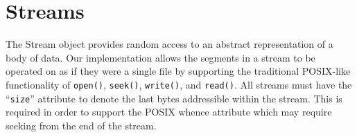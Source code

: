 \documentclass[10pt, conference]{IEEEtran}
\begin{document}




\section{Streams}
The Stream object provides random access to an abstract representation
of a body of data. Our implementation allows the segments in a stream
to be operated on as if they were a single file by supporting the
traditional POSIX-like functionality of
\texttt{open()}, \texttt{seek()}, \texttt{write()}, and
\texttt{read()}. All streams must have the ``\texttt{size}'' attribute
to denote the last bytes addressible within the stream. This is
required in order to support the POSIX whence attribute which may
require seeking from the end of the stream.
\end{document}

